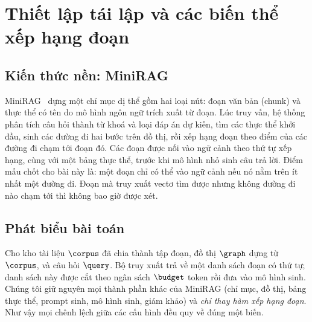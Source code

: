 \section{Thiết lập tái lập và các biến thể xếp hạng đoạn}\label{sec:method}

\subsection{Kiến thức nền: MiniRAG}\label{sec:background}
MiniRAG~\cite{fan2025minirag} dựng một chỉ mục dị thể gồm hai loại nút: đoạn văn bản (chunk) và thực thể có tên do mô hình ngôn ngữ trích xuất từ đoạn.
Lúc truy vấn, hệ thống phân tích câu hỏi thành từ khoá và loại đáp án dự kiến, tìm các thực thể khởi đầu, sinh các đường đi hai bước trên đồ thị, rồi xếp hạng đoạn theo điểm của các đường đi chạm tới đoạn đó.
Các đoạn được nối vào ngữ cảnh theo thứ tự xếp hạng, cùng với một bảng thực thể, trước khi mô hình nhỏ sinh câu trả lời.
Điểm mấu chốt cho bài này là: một đoạn chỉ có thể vào ngữ cảnh nếu nó nằm trên ít nhất một đường đi.
Đoạn mà truy xuất vectơ tìm được nhưng không đường đi nào chạm tới thì không bao giờ được xét.

\subsection{Phát biểu bài toán}
Cho kho tài liệu $\corpus$ đã chia thành tập đoạn, đồ thị $\graph$ dựng từ $\corpus$, và câu hỏi $\query$.
Bộ truy xuất trả về một danh sách đoạn có thứ tự; danh sách này được cắt theo ngân sách $\budget$ token rồi đưa vào mô hình sinh.
Chúng tôi giữ nguyên mọi thành phần khác của MiniRAG (chỉ mục, đồ thị, bảng thực thể, prompt sinh, mô hình sinh, giám khảo) và \emph{chỉ thay hàm xếp hạng đoạn}.
Như vậy mọi chênh lệch giữa các cấu hình đều quy về đúng một biến.

